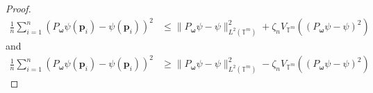 \documentclass[multixcb]{amstext-l}
\theoremstyle{plain}
\theoremstyle{definition}
\theoremstyle{definition}
\theoremstyle{remark}
\numberwithin{equation}{chapter}
\begin{document}
\begin{proof}
    \begin{equation}\label{EQ_4_7}\begin{aligned}
    \frac{1}{n}\sum\limits_{i=1}^{n}(P_{\boldsymbol{\omega}}\psi(\boldsymbol{p}_i)-\psi(\boldsymbol{p}_i))^2  &\le \|P_{\boldsymbol{\omega}}\psi-\psi\|^2_{L^2(\mathbb{T}^m)} + \zeta_n V_{\mathbb{T}^m}((P_{\boldsymbol{\omega}}\psi-\psi)^2)
     \end{aligned}
\end{equation} and
    \begin{equation}\label{IQ_2}\begin{aligned}
    \frac{1}{n}\sum\limits_{i=1}^{n}(P_{\boldsymbol{\omega}}\psi(\boldsymbol{p}_i)-\psi(\boldsymbol{p}_i))^2  &\ge \|P_{\boldsymbol{\omega}}\psi-\psi\|^2_{L^2(\mathbb{T}^m)} - \zeta_n V_{\mathbb{T}^m}((P_{\boldsymbol{\omega}}\psi-\psi)^2) \end{aligned}
\end{equation}
    
    
    
    
    
    
   


\end{proof}
\end{document}

